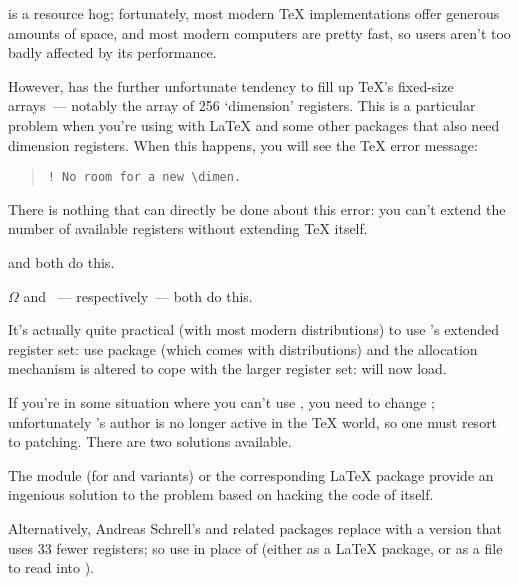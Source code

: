 \pictex{} is a resource hog; fortunately, most modern \TeX{}
implementations offer generous amounts of space, and most modern
computers are pretty fast, so users aren't too badly affected by its
performance.

However, \pictex{} has the further unfortunate tendency to fill up
\TeX{}'s fixed-size arrays~--- notably the array of 256 `dimension'
registers.  This is a particular problem when you're using
 with \LaTeX{} and some other packages that also need
dimension registers.  When this happens, you will see the \TeX{} error
message:
\begin{quote}
\begin{verbatim}
! No room for a new \dimen.
\end{verbatim}
\end{quote}
There is nothing that can directly be done about this error: you
can't extend the number of available  registers without
extending \TeX{} itself.
\begin{wideversion} %
   and  both do this.
\end{wideversion}
\begin{narrowversion}
  \ensuremath{\Omega} and \eTeX{}~---
   respectively~--- both do this.
\end{narrowversion}

It's actually quite practical (with most modern distributions) to use
\eTeX{}'s extended register set: use package  (which
comes with \eTeX{} distributions) and the allocation mechanism is
altered to cope with the larger register set: \pictex{} will now load.

If you're in some situation where you can't use \eTeX{}, you need to change
\pictex{}; unfortunately \pictex{}'s author is no longer active in the
\TeX{} world, so one must resort to patching.  There are two solutions
available.

The \CONTeXT{} module  (for \plaintex{} and
variants) or the corresponding \LaTeX{}  package provide
an ingenious solution to the problem based on hacking the code of
 itself.

Alternatively, Andreas Schrell's  and related
packages replace \pictex{} with a version that uses 33 fewer
 registers; so use  in place of
 (either as a \LaTeX{} package, or as a file to read
into \plaintex{}).

